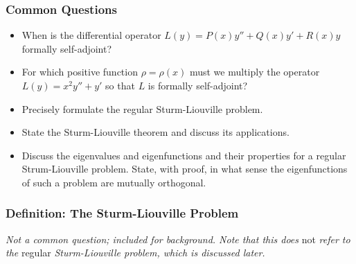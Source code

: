 \documentclass[11pt, a4paper]{article}
\begin{document}
\subsubsection{Common Questions}
\begin{itemize}

	\item When is the differential operator $ L(y) = P(x)y'' + Q(x) y' + R(x) y $ formally self-adjoint?
	
	\item For which positive function $ \rho = \rho(x) $ must we multiply the operator $ L(y) = x^{2}y'' + y' $ so that $ L $ is formally self-adjoint?

	\item Precisely formulate the regular Sturm-Liouville problem. 
	
	\item State the Sturm-Liouville theorem and discuss its applications.
	
	\item Discuss the eigenvalues and eigenfunctions and their properties for a regular Strum-Liouville problem. State, with proof, in what sense the eigenfunctions of such a problem are mutually orthogonal.
	
	
		
		
		


\end{itemize}


\subsubsection{Definition: The Sturm-Liouville Problem}
\textit{Not a common question; included for background. Note that this does} not \textit{refer to the} regular \textit{Sturm-Liouville problem, which is discussed later.} 
\vspace{2mm}
\end{document}
